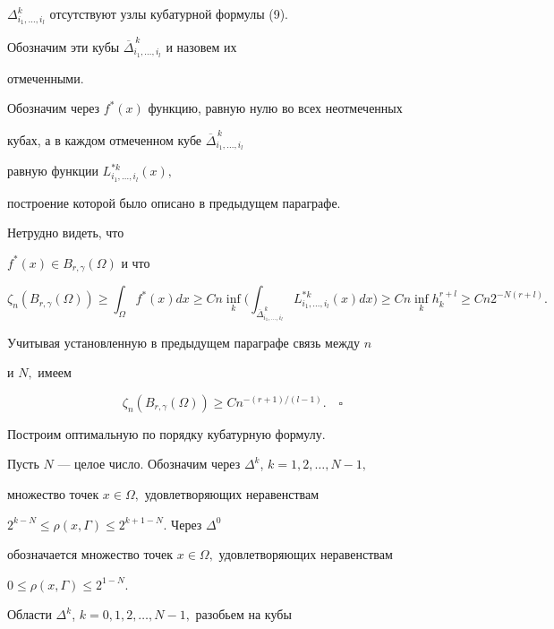 $\Delta^k_{i_1,\dotsc,i_l}$ отсутствуют узлы кубатурной формулы (9).


Обозначим эти кубы $\overline\Delta^{\,k}_{i_1,\dotsc,i_l} $ и назовем их


отмеченными.


Обозначим через $f^*(x) $ функцию, равную нулю во всех неотмеченных


кубах, а в каждом отмеченном кубе $\overline\Delta^{\,k}_{i_1,\dotsc,i_l}$


равную функции $ L^{*k}_{i_1,\dotsc,i_l}(x),$


построение которой было описано в предыдущем параграфе.


Нетрудно видеть, что


$f^*(x)\in B_{r,\gamma}(\Omega)$ и что


$$


\zeta_n( B_{r,\gamma}(\Omega)) \ge\int_\Omega f^*(x) dx


\ge Cn \inf_k\bigg(\int_{\overline\Delta^{\,k}_{i_1,\dotsc,i_l}}


L^{*k}_{i_1,\dotsc,i_l}(x) dx\bigg) \ge


Cn \inf_k h^{r+l}_k \ge Cn 2^{-N(r+l)}.


$$


Учитывая установленную в предыдущем параграфе связь между $n$


и $ N,$ имеем


$$


\zeta_n (B_{r,\gamma}(\Omega)) \ge Cn^{-(r+1)/(l-1)}.\quad\square


$$





Построим оптимальную по порядку кубатурную формулу.





Пусть $N$ --- целое число. Обозначим через $\Delta^k$, $k=1,2,\dotsc,N-1,$


множество точек $x\in\Omega,$ удовлетворяющих неравенствам


$2^{k-N} \le \rho (x,\Gamma) \le 2^{k+1-N}.$ Через $\Delta^0$


обозначается множество точек $x\in \Omega,$ удовлетворяющих неравенствам


$0\le \rho(x,\Gamma) \le 2^{1-N}.$





Области $\Delta^k$, $k=0,1,2,\dotsc,N-1,$ разобьем на кубы


